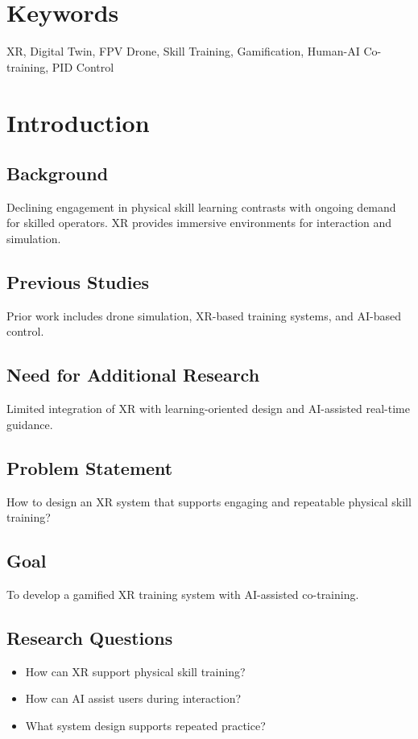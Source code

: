 \documentclass[12pt]{article}
\begin{document}
\section*{Keywords}
XR, Digital Twin, FPV Drone, Skill Training, Gamification, Human-AI Co-training, PID Control

\newpage
{}
\tableofcontents
\newpage
{}
\setcounter{page}{1}

\newpage
\section{Introduction}

\subsection{Background}
Declining engagement in physical skill learning contrasts with ongoing demand for skilled operators. XR provides immersive environments for interaction and simulation.

\subsection{Previous Studies}
Prior work includes drone simulation, XR-based training systems, and AI-based control.

\subsection{Need for Additional Research}
Limited integration of XR with learning-oriented design and AI-assisted real-time guidance.

\subsection{Problem Statement}
How to design an XR system that supports engaging and repeatable physical skill training?

\subsection{Goal}
To develop a gamified XR training system with AI-assisted co-training.

\subsection{Research Questions}
\begin{itemize}
    \item How can XR support physical skill training?
    \item How can AI assist users during interaction?
    \item What system design supports repeated practice?
\end{itemize}
\end{document}
